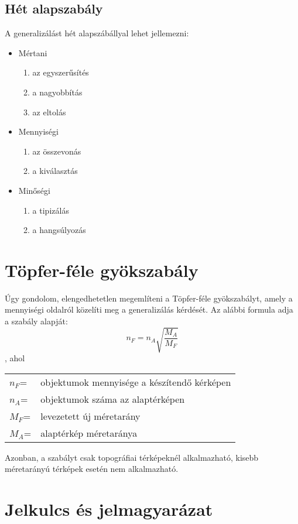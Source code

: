 		\subsection{Hét alapszabály}
		A generalizálást hét alapszábállyal lehet jellemezni:
		\begin{itemize}
			\item Mértani
			\begin{enumerate}
				\item az egyszerűsítés
				\item a nagyobbítás
				\item az eltolás
			\end{enumerate}
			\item Mennyiségi
			\begin{enumerate}
				\item az összevonás
				\item a kiválasztás
			\end{enumerate}
			\item Minőségi
			\begin{enumerate}
				\item a tipizálás
				\item a hangsúlyozás
			\end{enumerate}
		\end{itemize}
		
		\section{Töpfer-féle gyökszabály}
		Úgy gondolom, elengedhetetlen megemlíteni a Töpfer-féle gyökszabályt, amely a mennyiségi oldalról
		közelíti meg a generalizálás kérdését. Az alábbi formula adja a szabály alapját:
		\[
		n_F = n_A \sqrt{\frac{M_A}{M_F}}
		\], ahol
		\begin{center}
			\begin{tabular}{ll}
			$n_F$=&objektumok mennyisége a készítendő kérképen\\
			$n_A$=&objektumok száma az alaptérképen\\
			$M_F$=&levezetett új méretarány\\
			$M_A$=&alaptérkép méretaránya\\
			\end{tabular}			
		\end{center}
		Azonban, a szabályt csak topográfiai térképeknél alkalmazható, kisebb méretarányú térképek esetén nem alkalmazható.

		\section{Jelkulcs és jelmagyarázat}
		
